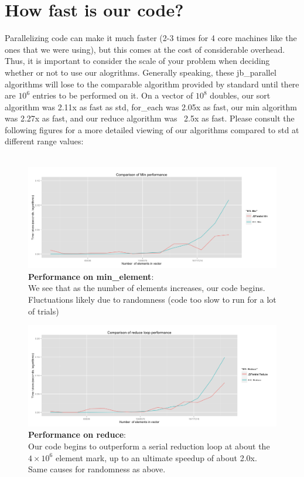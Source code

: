 \documentclass{article}
\begin{document}
\section{How fast is our code?}
Parallelizing code can make it much faster (2-3 times for 4 core machines like the ones that we were using), but this comes at the cost of considerable overhead. Thus, it is important to consider the scale of your problem when deciding whether or not to use our alogrithms. Generally speaking, these jb\_parallel algorithms will lose to the comparable algorithm provided by standard until there are $10^6$ entries to be performed on it. On a vector of $10^8$ doubles, our sort algorithm was 2.11x as fast as std, for\_each was 2.05x as fast, our min algorithm was 2.27x as fast, and our reduce algorithm was  ~2.5x as fast. Please consult the following figures for a more detailed viewing of our algorithms compared to std at different range values:\\\\
\newpage
 \begin{figure}[h!]
    \centering
\includegraphics[scale = 0.4]{Min_comparison}
    \caption{\textbf{Performance on min\_element}:\\We see that as the number of elements increases, our code begins. Fluctuations likely due to randomness (code too slow to run for a lot of trials)}
    \end{figure}
 \begin{figure}[h!]
    \centering
\includegraphics[scale = 0.4]{Reduce_comparison}
    \caption{\textbf{Performance on reduce}:\\ Our code begins to outperform a serial reduction loop at about the $4 \times 10^6$ element mark, up to an ultimate speedup of about 2.0x.  Same causes for randomness as above.}
    \end{figure}
\end{document}
